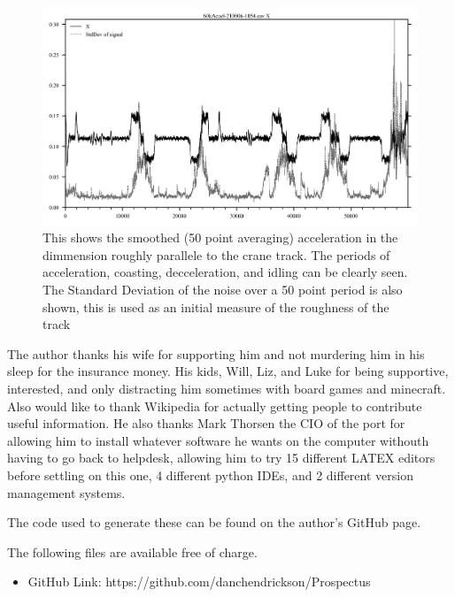 \documentclass[journal=jacsat,manuscript=article]{achemso}
\begin{document}
\begin{figure}
	\centering
	\includegraphics[width=0.7\linewidth]{"Figures/Average Smoothed Acceleration Curve"}
	\caption[Sample Acceleration]{This shows the smoothed (50 point averaging) acceleration in the dimmension roughly parallele to the crane track.  The periods of acceleration, coasting, decceleration, and idling can be clearly seen.  The Standard Deviation of the noise over a 50 point period is also shown, this is used as an initial measure of the roughness of the track}
	\label{fig:Sample-Acceleration-Curve}
\end{figure}



\pagebreak
\begin{acknowledgement}

The author thanks his wife for supporting him and not murdering him in his sleep for the insurance money.  His kids, Will, Liz, and Luke for being supportive, interested, and only distracting him sometimes with board games and minecraft.  Also would like to thank Wikipedia for actually getting people to contribute useful information.  He also thanks Mark Thorsen the CIO of the port for allowing him to install whatever software he wants on the computer withouth having to go back to helpdesk, allowing him to try 15 different LATEX editors before settling on this one, 4 different python IDEs, and 2 different version management systems.

\end{acknowledgement}

\begin{suppinfo}

The code used to generate these can be found on the author's GitHub page.

The following files are available free of charge.
\begin{itemize}
  \item GitHub Link: https://github.com/danchendrickson/Prospectus
\end{itemize}

\end{suppinfo}
\end{document}
